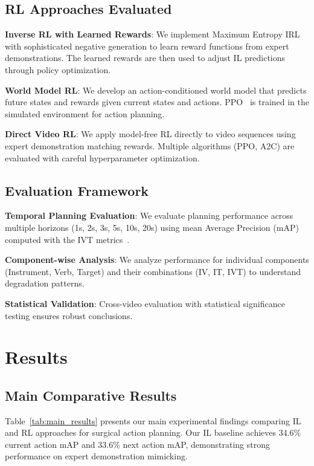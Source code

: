 \documentclass[runningheads]{llncs}
\begin{document}
\subsection{RL Approaches Evaluated}

\textbf{Inverse RL with Learned Rewards}: We implement Maximum Entropy IRL~\cite{ziebart2008maximum} with sophisticated negative generation to learn reward functions from expert demonstrations. The learned rewards are then used to adjust IL predictions through policy optimization.

\textbf{World Model RL}: We develop an action-conditioned world model that predicts future states and rewards given current states and actions. PPO~\cite{schulman2017proximal} is trained in the simulated environment for action planning.

\textbf{Direct Video RL}: We apply model-free RL directly to video sequences using expert demonstration matching rewards. Multiple algorithms (PPO, A2C) are evaluated with careful hyperparameter optimization.

\subsection{Evaluation Framework}

\textbf{Temporal Planning Evaluation}: We evaluate planning performance across multiple horizons (1s, 2s, 3s, 5s, 10s, 20s) using mean Average Precision (mAP) computed with the IVT metrics~\cite{nwoye2022cholect50}.

\textbf{Component-wise Analysis}: We analyze performance for individual components (Instrument, Verb, Target) and their combinations (IV, IT, IVT) to understand degradation patterns.

\textbf{Statistical Validation}: Cross-video evaluation with statistical significance testing ensures robust conclusions.


\section{Results}

\subsection{Main Comparative Results}

Table~\ref{tab:main_results} presents our main experimental findings comparing IL and RL approaches for surgical action planning. Our IL baseline achieves 34.6\% current action mAP and 33.6\% next action mAP, demonstrating strong performance on expert demonstration mimicking.
\end{document}

